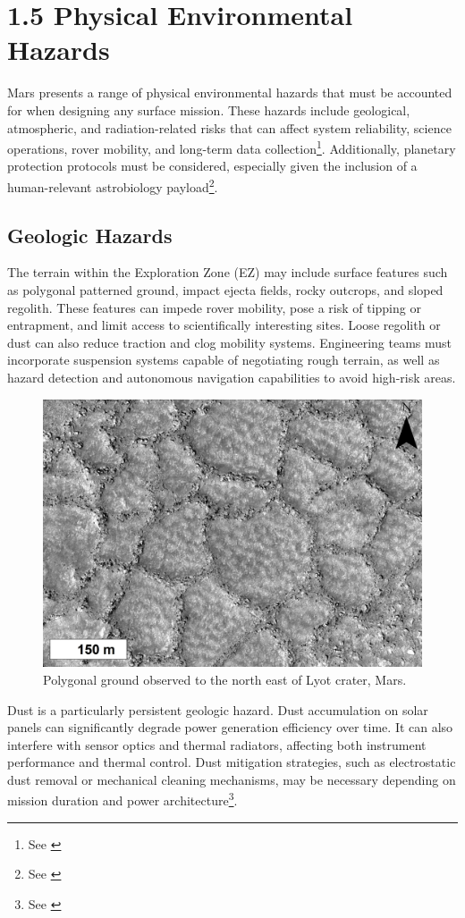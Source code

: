 \section*{1.5 Physical Environmental Hazards}

Mars presents a range of physical environmental hazards that must be accounted for when designing any surface mission. These hazards include geological, atmospheric, and radiation-related risks that can affect system reliability, science operations, rover mobility, and long-term data collection\footnote{See \cite{nasa_2019_env_hazards}}. Additionally, planetary protection protocols must be considered, especially given the inclusion of a human-relevant astrobiology payload\footnote{See \cite{georgetown_2023_life}}.

\subsection*{Geologic Hazards}

The terrain within the Exploration Zone (EZ) may include surface features such as polygonal patterned ground, impact ejecta fields, rocky outcrops, and sloped regolith. These features can impede rover mobility, pose a risk of tipping or entrapment, and limit access to scientifically interesting sites. Loose regolith or dust can also reduce traction and clog mobility systems. Engineering teams must incorporate suspension systems capable of negotiating rough terrain, as well as hazard detection and autonomous navigation capabilities to avoid high-risk areas.\\

\begin{figure}
    \centering
    \includegraphics[width=0.5\linewidth]{images/polygonal.jpg}
    \caption{Polygonal ground observed to the north east of Lyot crater, Mars.}
    \label{fig:enter-label}
\end{figure}

Dust is a particularly persistent geologic hazard. Dust accumulation on solar panels can significantly degrade power generation efficiency over time. It can also interfere with sensor optics and thermal radiators, affecting both instrument performance and thermal control. Dust mitigation strategies, such as electrostatic dust removal or mechanical cleaning mechanisms, may be necessary depending on mission duration and power architecture\footnote{See \cite{nasa_2019_env_hazards}}.


